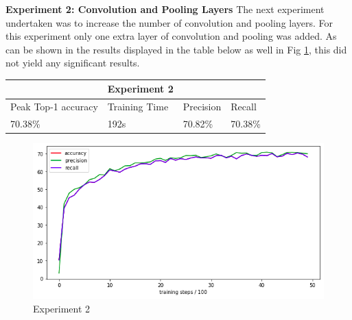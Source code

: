 \documentclass[12pt]{report}
\begin{document}
\begin{flushleft}
\vspace{0.5cm}
\textbf{Experiment 2: Convolution and Pooling Layers}
\linebreak
The next experiment undertaken was to increase the number of convolution and pooling layers. For this experiment only one extra layer of convolution and pooling was added. As can be shown in the results displayed in the table below as well in Fig \ref{fig:experiment-2}, this did not yield any significant results.

\vspace{0.5cm}
\begin{tabular}{llll}
                                          & Experiment 2                       &                                &                              \\ \hline
\multicolumn{1}{|l|}{Peak Top-1 accuracy} & \multicolumn{1}{l|}{Training Time} & \multicolumn{1}{l|}{Precision} & \multicolumn{1}{l|}{Recall}  \\ \hline
\multicolumn{1}{|l|}{70.38\%}             & \multicolumn{1}{l|}{192s}          & \multicolumn{1}{l|}{70.82\%}   & \multicolumn{1}{l|}{70.38\%} \\ \hline
\end{tabular}

\vspace{0.5cm}
\begin{figure}[h]
	\centering
	\includegraphics[width=12cm]{experiment-2}
	\caption{Experiment 2}
	\label{fig:experiment-2}
\end{figure}
\end{flushleft}
\end{document}
